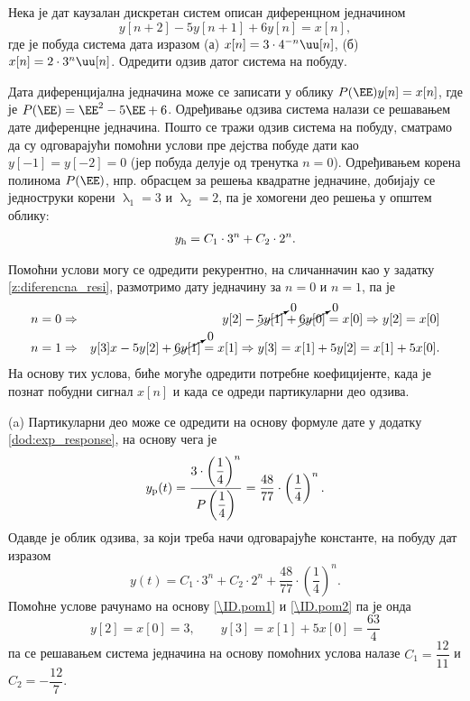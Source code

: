 \PID
Нека је дат каузалан дискретан систем описан диференцном једначином 
$$y[n+2] - 5 y[n+1] + 6 y[n] = x[n],$$ где је побуда система 
дата изразом (а) $x[n] = 3\cdot 4^{-n} \uu[n]$, (б) $x[n] = 2 \cdot 3^n \uu[n]$. Одредити одзив датог система на побуду.     

\RESENJE 
Дата диференцијална једначина може се записати у облику 
$P(\EE) y[n] = x[n]$, где је $P(\EE) = \EE^2 - 5\EE + 6$. 
Одређивање одзива система налази се решавањем дате диференцне једначина. Пошто се тражи одзив система на побуду, 
сматрамо да су одговарајући помоћни услови пре дејства побуде дати као $y[-1] = y[-2] = 0$ (јер побуда делује од 
тренутка $n=0$). Одређивањем корена полинома $P(\EE)$, нпр. обрасцем за решења квадратне једначине, добијају се 
једноструки корени $\uplambda_1 = 3$ и $\uplambda_2 = 2$, па је хомогени део решења у општем облику:
\begin{eqnarray}
    y_{\rm h} = C_1 \cdot 3^n + C_2 \cdot 2^n.
\end{eqnarray}

Помоћни услови могу се одредити рекурентно, на сличанначин као у задатку \ref{z:diferencna_resi}, размотримо дату једначину за $n = 0$ и $n = 1$, па је 
\begin{eqnarray}
    n=0 &\Rightarrow& y[2] - \cancelto{0}{5 y[1]} + \cancelto{0}{6 y[0]} = x[0] \Rightarrow y[2] = x[0] \label{\ID.pom1}
    \\ 
    n=1 &\Rightarrow& y[3] x- 5y[2] + \cancelto{0}{6y[1]} = x[1] \Rightarrow y[3] = x[1] + 5 y[2] = x[1] + 5 x[0]. \label{\ID.pom2}
\end{eqnarray}
На основу тих услова, биће могуће одредити потребне коефицијенте, када је познат побудни сигнал $x[n]$ и када се одреди партикуларни део одзива.



(a) Партикуларни део може се одредити на основу формуле дате у додатку \ref{dod:exp_response}, на основу чега је 
\begin{eqnarray}
    y_{\rm p}(t) = \dfrac{3 \cdot \left( \dfrac14 \right)^n }{ P\left( \dfrac14 \right) } = \dfrac{48}{77} \cdot \left( \dfrac14 \right)^n.
\end{eqnarray}
Одавде је облик одзива, за који треба начи одговарајуће константе, на побуду дат изразом 
\begin{equation}
    y(t) = C_1 \cdot 3^n + C_2 \cdot 2^n +  \dfrac{48}{77} \cdot \left( \dfrac14 \right)^n.
\end{equation}
Помоћне услове рачунамо на основу \eqref{\ID.pom1} и \eqref{\ID.pom2} па је онда 
\begin{equation}
    y[2] = x[0] = 3, \qquad y[3] = x[1] + 5x[0] = \dfrac{63}{4}   
\end{equation}
па се решавањем система једначина на основу помоћних услова налазе $C_1 = \dfrac{12}{11}$ и $C_2 = -\dfrac{12}{7}$.

